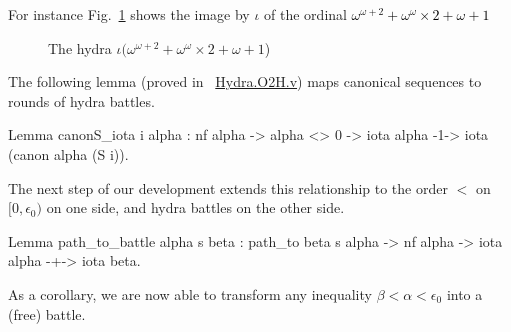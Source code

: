 For instance Fig.~\ref{fig:iota-example} shows the image by $\iota$ of the ordinal  \textcolor{black}{$\omega^{\omega+2}+\omega^\omega \times 2 + \omega + 1$}

  \begin{figure}[htb]
\centering
{}
\caption{The hydra $\iota(\omega^{\omega+2}+\omega^\omega \times 2 + \omega + 1$) \label{fig:iota-example}}

\end{figure}


The following lemma (proved in ~\href{../theories/html/hydras.Hydra.O2H.html}{Hydra.O2H.v}) maps  canonical sequences to rounds of hydra battles.


\label{lemma:canonS-iota}

\begin{Coqsrc}
Lemma canonS_iota i alpha :
    nf alpha -> alpha <> 0 ->
    iota alpha -1-> iota (canon alpha (S i)).
\end{Coqsrc}
                

The next step of our development extends this relationship to
the order $<$ on $[0,\epsilon_0)$ on one side, and hydra battles on the other side.


\begin{Coqsrc}
Lemma path_to_battle alpha s beta :
  path_to  beta  s alpha -> nf alpha ->
  iota alpha -+-> iota beta.
\end{Coqsrc}

As a corollary, we are now able to transform any inequality $\beta<\alpha<\epsilon_0$ into a (free) battle.

